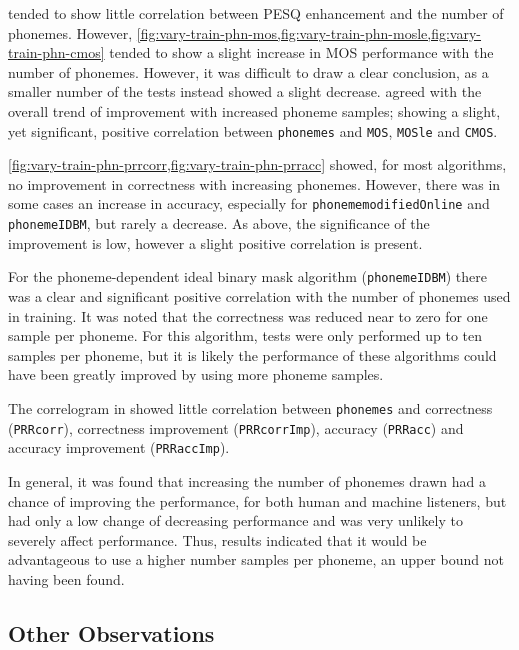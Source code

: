 \clearpage{}

 tended to show little correlation between
\ac{PESQ} enhancement and the number of phonemes. However, \cref{fig:vary-train-phn-mos,fig:vary-train-phn-mosle,fig:vary-train-phn-cmos}
tended to show a slight increase in \ac{MOS} performance with the
number of phonemes. However, it was difficult to draw a clear conclusion,
as a smaller number of the tests instead showed a slight decrease.
 agreed with the overall trend of improvement with
increased phoneme samples; showing a slight, yet significant, positive
correlation between \lstinline!phonemes! and \lstinline!MOS!, \lstinline!MOSle!
and \lstinline!CMOS!.

\cref{fig:vary-train-phn-prrcorr,fig:vary-train-phn-prracc} showed,
for most algorithms, no improvement in correctness with increasing
phonemes. However, there was in some cases an increase in accuracy,
especially for \lstinline!phonememodifiedOnline! and \lstinline!phonemeIDBM!,
but rarely a decrease. As above, the significance of the improvement
is low, however a slight positive correlation is present.

For the phoneme-dependent ideal binary mask algorithm (\lstinline!phonemeIDBM!)
there was a clear and significant positive correlation with the number
of phonemes used in training. It was noted that the correctness was
reduced near to zero for one sample per phoneme. For this algorithm,
tests were only performed up to ten samples per phoneme, but it is
likely the performance of these algorithms could have been greatly
improved by using more phoneme samples. 

The correlogram in  showed little correlation between
\lstinline!phonemes! and correctness (\lstinline!PRRcorr!), correctness
improvement (\lstinline!PRRcorrImp!), accuracy (\lstinline!PRRacc!)
and accuracy improvement (\lstinline!PRRaccImp!).

In general, it was found that increasing the number of phonemes drawn
had a chance of improving the performance, for both human and machine
listeners, but had only a low change of decreasing performance and
was very unlikely to severely affect performance. Thus, results indicated
that it would be advantageous to use a higher number samples per phoneme,
an upper bound not having been found.


\subsection{Other Observations}

